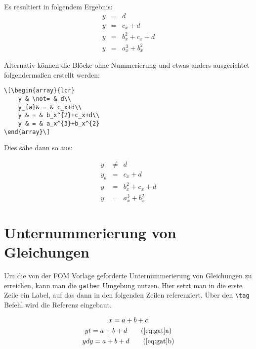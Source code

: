 Es resultiert in folgendem Ergebnis:
\begin{eqnarray}
    y & = & d\\
    y & = & c_x+d\\
    y & = & b_x^{2}+c_x+d\\
    y & = & a_x^{3}+b_x^{2}
\end{eqnarray}

Alternativ können die Blöcke ohne Nummerierung und etwas anders ausgerichtet folgendermaßen erstellt werden:
\begin{lstlisting}
\[\begin{array}{lcr}
    y & \not= & d\\
    y_{a}& = & c_x+d\\
    y & = & b_x^{2}+c_x+d\\
    y & = & a_x^{3}+b_x^{2}
\end{array}\]
\end{lstlisting}

Dies sähe dann so aus:

\[\begin{array}{lcr}
    y & \not= & d\\
    y_{a}& = & c_x+d\\
    y & = & b_x^{2}+c_x+d\\
    y & = & a_x^{3}+b_x^{2}
\end{array}\]

\section{Unternummerierung von Gleichungen}

Um die von der FOM Vorlage geforderte Unternummerierung von Gleichungen zu erreichen, kann man die \texttt{gather} Umgebung nutzen. Hier setzt man in die erste Zeile ein Label, auf das dann in den folgenden Zeilen referenziert. Über den \texttt{\textbackslash tag} Befehl wird die Referenz eingebaut.

\begin{gather}
x = a +  b +c \label{eq:gat}\\
yt = a + b + d \tag{\ref{eq:gat}a} \\
ydy = a + b + d \tag{\ref{eq:gat}b}
\end{gather}



